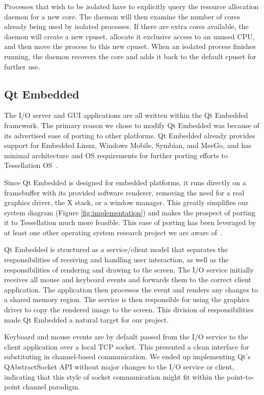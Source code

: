 \documentclass[letterpaper,twocolumn,11pt]{article}
\begin{document}
Processes that wish to be isolated have to explicitly query the resource allocation daemon for a new core. The daemon will then examine the number of cores already being used by isolated processes. If there are extra cores available, the daemon will create a new cpuset, allocate it exclusive access to an unused CPU, and then move the process to this new cpuset. When an isolated process finishes running, the daemon recovers the core and adds it back to the default cpuset for further use.

\subsection{Qt Embedded}

The I/O server and GUI applications are all written within the Qt Embedded framework. The primary reason we chose to modify Qt Embedded was because of its advertised ease of porting to other platforms. Qt Embedded already provides support for Embedded Linux, Windows Mobile, Symbian, and MeeGo, and has minimal architecture and OS requirements for further porting efforts to Tessellation OS~\cite{qtembedded}.

Since Qt Embedded is designed for embedded platforms, it runs directly on a framebuffer with its provided software renderer, removing the need for a real graphics driver, the X stack, or a window manager. This greatly simplifies our system diagram (Figure \ref{fig:implementation}) and makes the prospect of porting it to Tessellation much more feasible. This ease of porting has been leveraged by at least one other operating system research project we are aware of~\cite{ibos}. 

Qt Embedded is structured as a service/client model that separates the responsibilities of receiving and handling user interaction, as well as the responsibilities of rendering and drawing to the screen. The I/O service initially receives all mouse and keyboard events and forwards them to the correct client application. The application then processes the event and renders any changes to a shared memory region. The service is then responsible for using the graphics driver to copy the rendered image to the screen. This division of responsibilities made Qt Embedded a natural target for our project.

Keyboard and mouse events are by default passed from the I/O service to the client application over a local TCP socket. This presented a clean interface for substituting in channel-based communication. We ended up implementing Qt's QAbstractSocket API without major changes to the I/O service or client, indicating that this style of socket communication might fit within the point-to-point channel paradigm.
\end{document}
